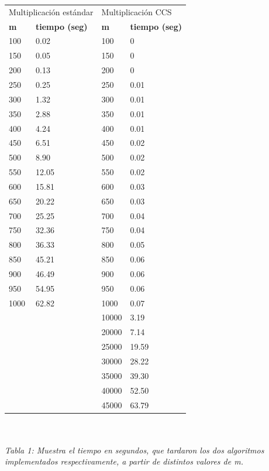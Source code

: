\documentclass[a4paper,11pt]{article}
\begin{document}
\begin{tabular}{|l||l|l||l|}
\hline
\multicolumn{2}{|l|}{Multiplicaci\'on est\'andar}&\multicolumn{2}{l|}{Multiplicaci\'on CCS}\\
\cline{1-4}
\textbf{m}&\textbf{tiempo (seg)}&\textbf{m}&\textbf{tiempo (seg)}\\
\hline\hline
100 & 0.02 & 100 & 0\\
150 & 0.05 & 150 & 0\\
200 & 0.13 & 200 & 0\\
250 & 0.25 & 250 & 0.01\\
300 & 1.32 & 300 & 0.01\\
350 & 2.88 & 350 & 0.01\\
400 & 4.24 & 400 & 0.01\\
450 & 6.51 & 450 & 0.02\\
500 & 8.90 & 500 & 0.02\\
550 & 12.05 & 550 & 0.02\\
600 & 15.81 & 600 & 0.03\\
650 & 20.22 & 650 & 0.03\\
700 & 25.25 & 700 & 0.04\\
750 & 32.36 & 750 & 0.04\\
800 & 36.33 & 800 & 0.05\\
850 & 45.21 & 850 & 0.06\\
900 & 46.49 & 900 & 0.06\\
950 & 54.95 & 950 & 0.06\\
1000 & 62.82 & 1000 & 0.07\\
 &  & 10000 & 3.19\\
 &  & 20000 & 7.14\\
 &  & 25000 & 19.59\\
 &  & 30000 & 28.22\\
 &  & 35000 & 39.30\\
 &  & 40000 & 52.50\\
 &  & 45000 & 63.79\\
\hline
\end{tabular}\\
\\
\small\emph{Tabla 1: Muestra el tiempo en segundos, que tardaron los dos algoritmos implementados respectivamente, a partir de distintos valores de m.}
\end{document}
